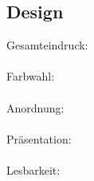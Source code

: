 \subsection{Design}
\begin{center}
Gesamteindruck:\\
\\\bigskip
Farbwahl:\\
\\\bigskip
Anordnung:\\
\\\bigskip
Präsentation:\\
\\\bigskip
Lesbarkeit:\\
\end{center}


